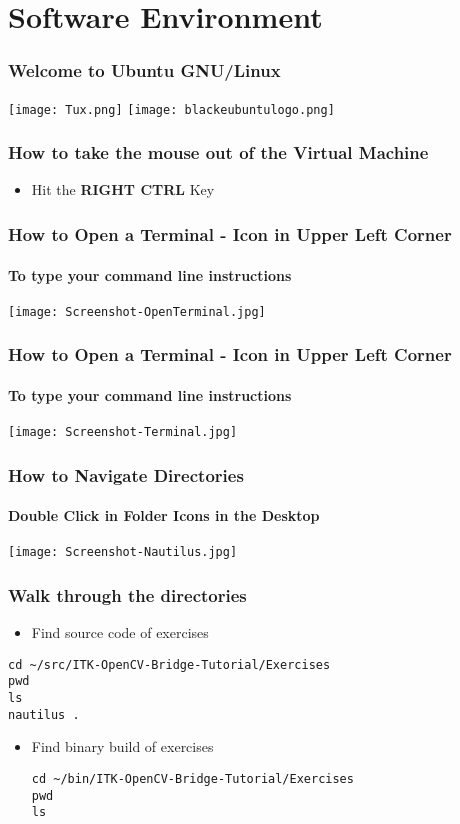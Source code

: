 \section{Software Environment}


\begin{frame}
\frametitle{Welcome to Ubuntu GNU/Linux}
\begin{center}
\texttt{[image: Tux.png]}
\texttt{[image: blackeubuntulogo.png]}
\end{center}
\end{frame}

\begin{frame}
\frametitle{How to take the mouse out of the Virtual Machine}
\begin{itemize}
\item Hit the \textbf{RIGHT CTRL} Key
\end{itemize}
\end{frame}

\begin{frame}
\frametitle{How to Open a Terminal - Icon in Upper Left Corner}
\framesubtitle{To type your command line instructions}
\begin{center}
\texttt{[image: Screenshot-OpenTerminal.jpg]}
\end{center}
\end{frame}

\begin{frame}
\frametitle{How to Open a Terminal - Icon in Upper Left Corner}
\framesubtitle{To type your command line instructions}
\begin{center}
\texttt{[image: Screenshot-Terminal.jpg]}
\end{center}
\end{frame}

\begin{frame}
\frametitle{How to Navigate Directories}
\framesubtitle{Double Click in Folder Icons in the Desktop}
\begin{center}
\texttt{[image: Screenshot-Nautilus.jpg]}
\end{center}
\end{frame}

\begin{frame}[fragile]
\frametitle{Walk through the directories}
\begin{itemize}
\item Find source code of exercises
\end{itemize}
\begin{verbatim}
cd ~/src/ITK-OpenCV-Bridge-Tutorial/Exercises
pwd
ls
nautilus .
\end{verbatim}
\begin{itemize}
\pause
\item Find binary build of exercises
\begin{verbatim}
cd ~/bin/ITK-OpenCV-Bridge-Tutorial/Exercises
pwd
ls
\end{verbatim}
\end{itemize}
\end{frame}

